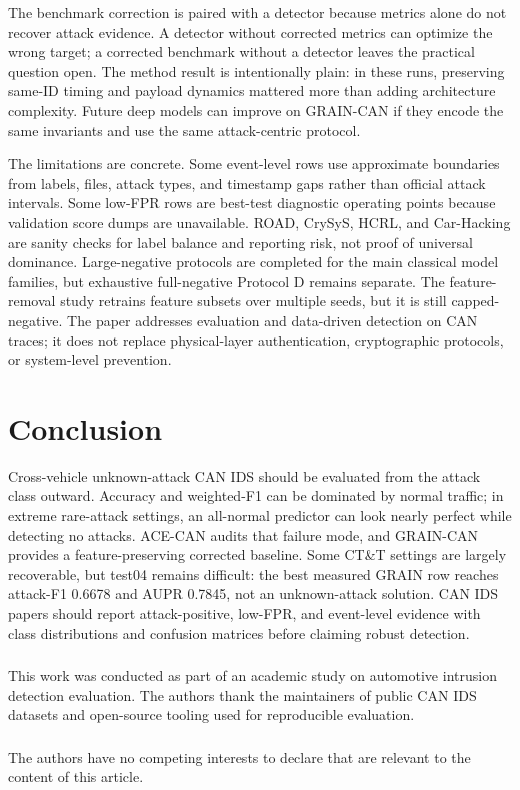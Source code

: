 \documentclass[runningheads]{llncs}
\newcommand{\method}{GRAIN-CAN}
\newcommand{\framework}{ACE-CAN}
\begin{document}
The benchmark correction is paired with a detector because metrics alone do not recover attack evidence.  A detector without corrected metrics can optimize the wrong target; a corrected benchmark without a detector leaves the practical question open.  The method result is intentionally plain: in these runs, preserving same-ID timing and payload dynamics mattered more than adding architecture complexity.  Future deep models can improve on \method{} if they encode the same invariants and use the same attack-centric protocol.

The limitations are concrete.  Some event-level rows use approximate boundaries from labels, files, attack types, and timestamp gaps rather than official attack intervals.  Some low-FPR rows are best-test diagnostic operating points because validation score dumps are unavailable.  ROAD, CrySyS, HCRL, and Car-Hacking are sanity checks for label balance and reporting risk, not proof of universal dominance.  Large-negative protocols are completed for the main classical model families, but exhaustive full-negative Protocol D remains separate.  The feature-removal study retrains feature subsets over multiple seeds, but it is still capped-negative.  The paper addresses evaluation and data-driven detection on CAN traces; it does not replace physical-layer authentication, cryptographic protocols, or system-level prevention.

\section{Conclusion}
Cross-vehicle unknown-attack CAN IDS should be evaluated from the attack class outward.  Accuracy and weighted-F1 can be dominated by normal traffic; in extreme rare-attack settings, an all-normal predictor can look nearly perfect while detecting no attacks.  \framework{} audits that failure mode, and \method{} provides a feature-preserving corrected baseline.  Some CT\&T settings are largely recoverable, but test04 remains difficult: the best measured GRAIN row reaches attack-F1 0.6678 and AUPR 0.7845, not an unknown-attack solution.  CAN IDS papers should report attack-positive, low-FPR, and event-level evidence with class distributions and confusion matrices before claiming robust detection.

\begin{credits}
\subsubsection{\ackname} This work was conducted as part of an academic study on automotive intrusion detection evaluation.  The authors thank the maintainers of public CAN IDS datasets and open-source tooling used for reproducible evaluation.

\subsubsection{\discintname} The authors have no competing interests to declare that are relevant to the content of this article.
\end{credits}
\end{document}
